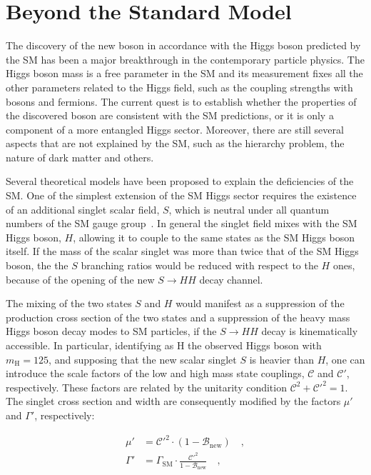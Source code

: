 \section{Beyond the Standard Model}
\label{sec:BSM}

The discovery of the new boson in accordance with the Higgs boson predicted by the SM has been a major breakthrough in the contemporary particle physics. The Higgs boson mass is a free parameter in the SM and its measurement fixes all the other parameters related to the Higgs field, such as the coupling strengths with bosons and fermions. The current quest is to establish whether the properties of the discovered boson are consistent with the SM predictions, or it is only a component of a more entangled Higgs sector. Moreover, there are still several aspects that are not explained by the SM, such as the hierarchy problem, the nature of dark matter and others.

Several theoretical models have been proposed to explain the deficiencies of the SM. One of the simplest extension of the SM Higgs sector requires the existence of an additional singlet scalar field, $S$, which is neutral under all quantum numbers of the SM gauge group~\cite{Robens:2015gla}. In general the singlet field mixes with the SM Higgs boson, $H$, allowing it to couple to the same states as the SM Higgs boson itself. If the mass of the scalar singlet was more than twice that of the SM Higgs boson, the the $S$ branching ratios would be reduced with respect to the $H$ ones, because of the opening of the new $S \to HH$ decay channel.

The mixing of the two states $S$ and $H$ would manifest as a suppression of the production cross section of the two states and a suppression of the heavy mass Higgs boson decay modes to SM particles, if the $S \to HH$ decay is kinematically accessible. In particular, identifying as H the observed Higgs boson with $m_\mathrm{H} = 125$\GeV, and supposing that the new scalar singlet $S$ is heavier than $H$, one can introduce the scale factors of the low and high mass state couplings, $\mathcal{C}$ and $\mathcal{C'}$, respectively. These factors are related by the unitarity condition $\mathcal{C}^2 + \mathcal{C'}^2 = 1$. The singlet cross section and width are consequently modified by the factors $\mu'$ and $\Gamma'$, respectively:

\begin{equation}
\begin{split}
\mu' &= \mathcal{C'}^2 \cdot (1 - \mathcal{B}_\mathrm{new}) \quad ,\\
\Gamma' &= \Gamma_\mathrm{SM} \cdot \frac{\mathcal{C'}^2}{1 - \mathcal{B}_\mathrm{new}} \quad ,
\end{split}
\end{equation}

